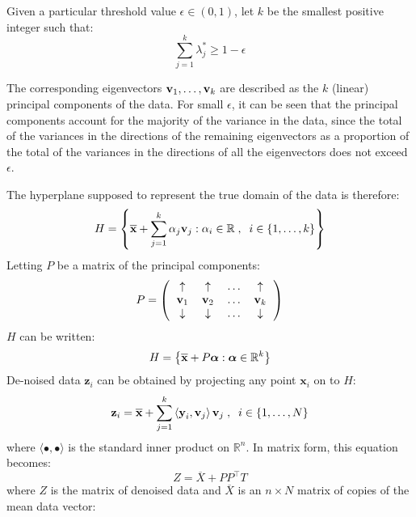 \documentclass[preprint,authoryear,3p]{elsarticle}
\begin{document}
Given a particular threshold value $\epsilon \in (0,1)$, let $k$ be the smallest positive integer such that:
$$ \displaystyle \sum_{j = 1}^{k} \lambda_{j}^{*} \geq 1 - \epsilon $$

The corresponding eigenvectors $\textbf{v}_{1} , \mathellipsis , \textbf{v}_{k}$ are described as the $k$ (linear) principal components of the data. For small $\epsilon$, it can be seen that the principal components account for the majority of the variance in the data, since the total of the variances in the directions of the remaining eigenvectors as a proportion of the total of the variances in the directions of all the eigenvectors does not exceed $\epsilon$.

The hyperplane supposed to represent the true domain of the data is therefore:
$$ H = \left\{ \overline{\textbf{x}} + \displaystyle \sum_{j = 1}^{k} \alpha_j \textbf{v}_{j} : \alpha_i \in \mathbb{R} \; , \; \; i \in \{ 1, \mathellipsis, k \} \right\} $$
Letting $P$ be a matrix of the principal components:
\begin{equation*}
P = \left(
\begin{tabular}{cccc}
$\uparrow$ & $\uparrow$ & $\mathellipsis$ & $\uparrow$\\
$\textbf{v}_{1}$ & $\textbf{v}_{2}$ & $\mathellipsis$ & $\textbf{v}_{k}$ \\
$\downarrow$ & $\downarrow$ & $\mathellipsis$ & $\downarrow$
\end{tabular} \right)
\end{equation*}
$H$ can be written:
$$
H = \left\{ \overline{\textbf{x}} + P \mbox{\boldmath$\alpha$} : \mbox{\boldmath$\alpha$} \in \mathbb{R}^{k} \right\}
$$
De-noised data $\textbf{z}_i$ can be obtained by projecting any point $\textbf{x}_i$ on to $H$:
$$ \textbf{z}_i = \overline{\textbf{x}} + \displaystyle \sum_{j = 1}^{k} \left\langle \textbf{y}_i , \textbf{v}_{j} \right\rangle \textbf{v}_{j} \; , \; \; i \in \{1, \mathellipsis , N \} $$
where $\langle \bullet , \bullet \rangle$ is the standard inner product on $\mathbb{R}^n$. In matrix form, this equation becomes:
\begin{equation*}
Z = \overline{X} + PP^\top T
\end{equation*}
where $Z$ is the matrix of denoised data and $\overline{X}$ is an $n \times N$ matrix of copies of the mean data vector:
\end{document}
